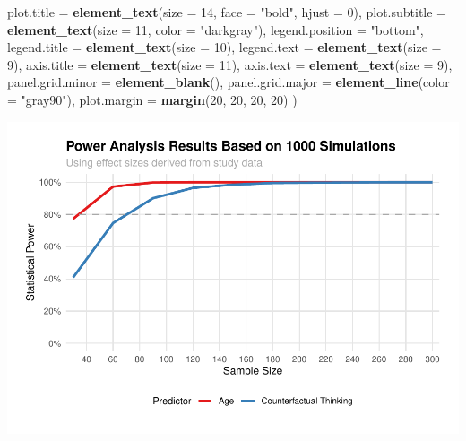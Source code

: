 \documentclass[
  doc]{apa6}
\newenvironment{Shaded}{\begin{snugshade}}{\end{snugshade}}
\newcommand{\AttributeTok}[1]{\textcolor[rgb]{0.13,0.29,0.53}{#1}}
\newcommand{\DecValTok}[1]{\textcolor[rgb]{0.00,0.00,0.81}{#1}}
\newcommand{\FunctionTok}[1]{\textcolor[rgb]{0.13,0.29,0.53}{\textbf{#1}}}
\newcommand{\NormalTok}[1]{#1}
\newcommand{\StringTok}[1]{\textcolor[rgb]{0.31,0.60,0.02}{#1}}
\begin{document}
\begin{Shaded}
\begin{Highlighting}[]
    \AttributeTok{plot.title =} \FunctionTok{element\_text}\NormalTok{(}\AttributeTok{size =} \DecValTok{14}\NormalTok{, }\AttributeTok{face =} \StringTok{"bold"}\NormalTok{, }\AttributeTok{hjust =} \DecValTok{0}\NormalTok{),}
    \AttributeTok{plot.subtitle =} \FunctionTok{element\_text}\NormalTok{(}\AttributeTok{size =} \DecValTok{11}\NormalTok{, }\AttributeTok{color =} \StringTok{"darkgray"}\NormalTok{),}
    \AttributeTok{legend.position =} \StringTok{"bottom"}\NormalTok{,}
    \AttributeTok{legend.title =} \FunctionTok{element\_text}\NormalTok{(}\AttributeTok{size =} \DecValTok{10}\NormalTok{),}
    \AttributeTok{legend.text =} \FunctionTok{element\_text}\NormalTok{(}\AttributeTok{size =} \DecValTok{9}\NormalTok{),}
    \AttributeTok{axis.title =} \FunctionTok{element\_text}\NormalTok{(}\AttributeTok{size =} \DecValTok{11}\NormalTok{),}
    \AttributeTok{axis.text =} \FunctionTok{element\_text}\NormalTok{(}\AttributeTok{size =} \DecValTok{9}\NormalTok{),}
    \AttributeTok{panel.grid.minor =} \FunctionTok{element\_blank}\NormalTok{(),}
    \AttributeTok{panel.grid.major =} \FunctionTok{element\_line}\NormalTok{(}\AttributeTok{color =} \StringTok{"gray90"}\NormalTok{),}
    \AttributeTok{plot.margin =} \FunctionTok{margin}\NormalTok{(}\DecValTok{20}\NormalTok{, }\DecValTok{20}\NormalTok{, }\DecValTok{20}\NormalTok{, }\DecValTok{20}\NormalTok{)}
\NormalTok{  )}
\end{Highlighting}
\end{Shaded}

\includegraphics{final_project_files/figure-latex/unnamed-chunk-9-1.pdf}
\end{document}
